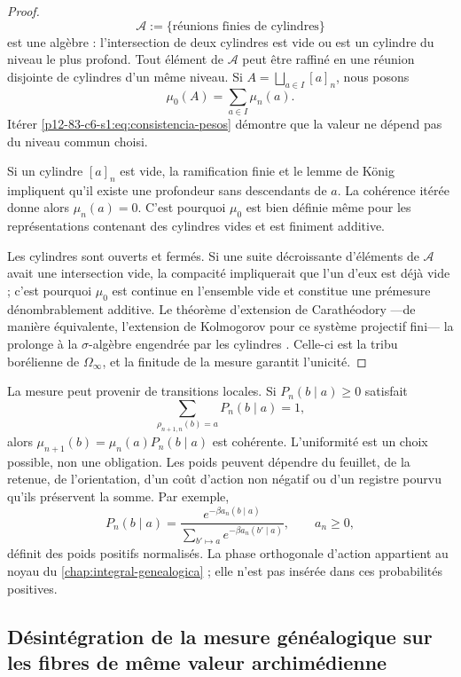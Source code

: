\begin{proof}
\[
 \mathscr A
 :=\{\text{réunions finies de cylindres}\}
\]
est une algèbre : l'intersection de deux cylindres est vide ou est un cylindre du
niveau le plus profond. Tout élément de \(\mathscr A\) peut être raffiné en une
réunion disjointe de cylindres d'un même niveau. Si
\(A=\bigsqcup_{a\in I}[a]_n\), nous posons
\[
 \mu_0(A)=\sum_{a\in I}\mu_n(a).
\]
Itérer \eqref{p12-83-c6-s1:eq:consistencia-pesos} démontre que la valeur ne dépend pas du
niveau commun choisi.

Si un cylindre \([a]_n\) est vide, la ramification finie et le lemme de König
\cite{Koenig1936}
impliquent qu'il existe une profondeur sans descendants de \(a\). La
cohérence itérée donne alors \(\mu_n(a)=0\). C'est pourquoi \(\mu_0\) est bien
définie même pour les représentations contenant des cylindres vides et est
finiment additive.

Les cylindres sont ouverts et fermés. Si une suite décroissante
d'éléments de \(\mathscr A\) avait une intersection vide, la compacité
impliquerait que l'un d'eux est déjà vide ; c'est pourquoi \(\mu_0\) est continue en
l'ensemble vide et constitue une prémesure dénombrablement additive. Le théorème d'extension de
Carathéodory ---de manière équivalente, l'extension de Kolmogorov pour ce système
projectif fini--- la prolonge à la \(\sigma\)-algèbre engendrée par les
cylindres \cite{Caratheodory1914,Kolmogorov1933}. Celle-ci est la tribu borélienne de
\(\Omega_\infty\), et la finitude de la
mesure garantit l'unicité.
\end{proof}

La mesure peut provenir de transitions locales. Si
\(P_n(b\mid a)\ge0\) satisfait
\[
 \sum_{\rho_{n+1,n}(b)=a}P_n(b\mid a)=1,
\]
alors
\(\mu_{n+1}(b)=\mu_n(a)P_n(b\mid a)\) est cohérente. L'uniformité est un
choix possible, non une obligation. Les poids peuvent dépendre du feuillet,
de la retenue, de l'orientation, d'un coût d'action non négatif ou d'un registre pourvu
qu'ils préservent la somme. Par exemple,
\[
 P_n(b\mid a)
 =\frac{e^{-\beta a_n(b\mid a)}}
        {\sum_{b'\mapsto a}e^{-\beta a_n(b'\mid a)}},
 \qquad a_n\geq0,
\]
définit des poids positifs normalisés. La phase orthogonale d'action appartient au
noyau du \cref{chap:integral-genealogica} ; elle n'est pas insérée dans ces
probabilités positives.

\subsection{Désintégration de la mesure généalogique sur les fibres de même valeur archimédienne}

